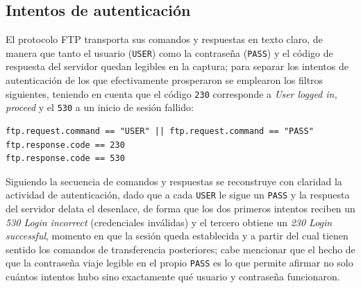 \subsection{Intentos de autenticación}

El protocolo FTP \cite{rfc959} transporta sus comandos y respuestas en texto claro, de manera que tanto el usuario (\texttt{USER}) como la contraseña (\texttt{PASS}) y el código de respuesta del servidor quedan legibles en la captura; para separar los intentos de autenticación de los que efectivamente prosperaron se emplearon los filtros siguientes, teniendo en cuenta que el código \texttt{230} corresponde a \emph{User logged in, proceed} y el \texttt{530} a un inicio de sesión fallido:

\begin{lstlisting}
ftp.request.command == "USER" || ftp.request.command == "PASS"
ftp.response.code == 230
ftp.response.code == 530
\end{lstlisting}


\begin{analisis}
  Siguiendo la secuencia de comandos y respuestas se reconstruye con claridad la actividad de autenticación, dado que a cada \texttt{USER} le sigue un \texttt{PASS} y la respuesta del servidor delata el desenlace, de forma que los dos primeros intentos reciben un \emph{530 Login incorrect} (credenciales inválidas) y el tercero obtiene un \emph{230 Login successful}, momento en que la sesión queda establecida y a partir del cual tienen sentido los comandos de transferencia posteriores; cabe mencionar que el hecho de que la contraseña viaje legible en el propio \texttt{PASS} es lo que permite afirmar no solo cuántos intentos hubo sino exactamente qué usuario y contraseña funcionaron.
\end{analisis}

